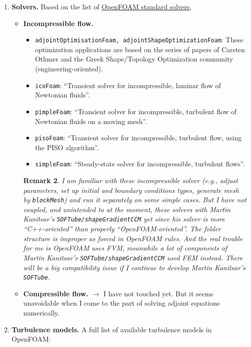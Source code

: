\documentclass[onsided]{book}
\numberwithin{equation}{section}
\newtheorem{remark}{Remark}[section]
\begin{document}
\begin{enumerate}
    \begin{remark}
        I have read almost all of these references, except C++ Source Code Guides, to see the big picture of OpenFOAM and which features are available. But I need time to consider these available features on theoretical side and dive deeper in C++ source codes to know how to practically make them fit to our software.
    \end{remark}
    \item \textbf{Solvers.} Based on the list of \href{https://www.openfoam.com/documentation/user-guide/standard-solvers.php}{OpenFOAM standard solvers},
    \begin{itemize}
        \item \textbf{Incompressible flow.}
        \begin{itemize}
            \item \texttt{adjointOptimisationFoam, adjointShapeOptimizationFoam}: These optimization applications are based on the series of papers of Carsten Othmer and the Greek Shape/Topology Optimization community (engineering-oriented).
            \item \texttt{icoFoam}: ``Transient solver for incompressible, laminar flow of Newtonian fluids''.
            \item \texttt{pimpleFoam}: ``Transient solver for incompressible, turbulent flow of Newtonian fluids on a moving mesh''.
            \item \texttt{pisoFoam}: ``Transient solver for incompressible, turbulent flow, using the PISO algorithm''.
            \item \texttt{simpleFoam}: ``Steady-state solver for incompressible, turbulent flows''.
        \end{itemize}
    
        \begin{remark}
            I am familiar with these incompressible solver (e.g., adjust parameters, set up initial and boundary conditions types, generate mesh by \texttt{blockMesh}) and run it separately on some simple cases. But I have not coupled, and unintended to at the moment, these solvers with Martin Kanitsar's \texttt{SOFTube/shapeGradientCCM} yet since his solver is more ``C++-oriented'' than properly ``OpenFOAM-oriented''. The folder structure is improper as forced in OpenFOAM rules. And the real trouble for me is OpenFOAM uses FVM, meanwhile a lot of components of Martin Kanitsar's \texttt{SOFTube/shapeGradientCCM} used FEM instead. There will be a big compatibility issue if I continue to develop Martin Kanitsar's \texttt{SOFTube}.
        \end{remark}
        \item \textbf{Compressible flow.} $\to$ I have not touched yet. But it seems unavoidable when I come to the part of solving adjoint equations numerically.
    \end{itemize}
    \item \textbf{Turbulence models.} A full list of available turbulence models in OpenFOAM:
    

\end{enumerate}
\end{document}

